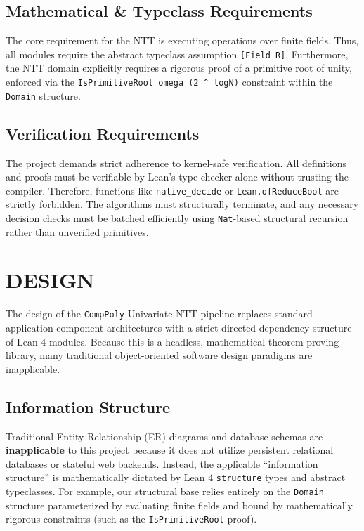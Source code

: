 \documentclass[a4paper,12pt]{report}
\begin{document}
\section{Mathematical \& Typeclass Requirements}
The core requirement for the NTT is executing operations over finite fields. Thus, all modules require the abstract typeclass assumption \texttt{[Field R]}. Furthermore, the NTT domain explicitly requires a rigorous proof of a primitive root of unity, enforced via the \texttt{IsPrimitiveRoot omega (2 \^{} logN)} constraint within the \texttt{Domain} structure. 

\section{Verification Requirements}
The project demands strict adherence to kernel-safe verification. All definitions and proofs must be verifiable by Lean's type-checker alone without trusting the compiler. Therefore, functions like \texttt{native\_decide} or \texttt{Lean.}\allowbreak\texttt{ofReduceBool} are strictly forbidden. The algorithms must structurally terminate, and any necessary decision checks must be batched efficiently using \texttt{Nat}-based structural recursion rather than unverified primitives.
\newpage

\chapter{DESIGN}
The design of the \texttt{CompPoly} Univariate NTT pipeline replaces standard application component architectures with a strict directed dependency structure of Lean 4 modules. Because this is a headless, mathematical theorem-proving library, many traditional object-oriented software design paradigms are inapplicable.

\section{Information Structure}
Traditional Entity-Relationship (ER) diagrams and database schemas are \textbf{inapplicable} to this project because it does not utilize persistent relational databases or stateful web backends. Instead, the applicable ``information structure'' is mathematically dictated by Lean 4 \texttt{structure} types and abstract typeclasses. For example, our structural base relies entirely on the \texttt{Domain} structure parameterized by evaluating finite fields and bound by mathematically rigorous constraints (such as the \texttt{IsPrimitiveRoot} proof).
\end{document}
